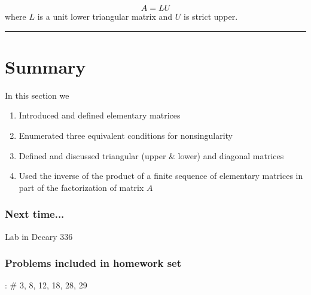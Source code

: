 	 \[   A = LU \]
	 where $L$ is a unit lower triangular matrix and $U$ is strict upper.  

\rule[0.01in]{\textwidth}{0.0025in}








\section*{Summary}


 In this section we 
\begin{enumerate}
	\item Introduced and defined elementary matrices
	\item Enumerated three equivalent conditions for nonsingularity 
	\item Defined and discussed triangular (upper \& lower) and diagonal matrices
	\item Used the inverse of the product of a finite sequence of elementary matrices in part of the factorization of matrix $A$ 
	
	
\end{enumerate}
 



\subsubsection*{Next time...}
Lab in Decary 336



\subsubsection*{Problems included in homework set}
: \# 3, 8, 12, 18, 28, 29






 








